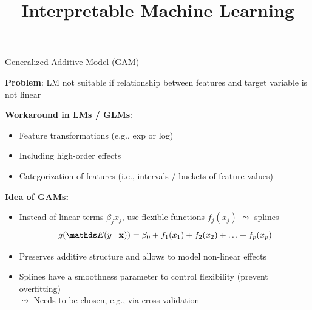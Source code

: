 \documentclass[11pt,compress,t,notes=noshow, aspectratio=169, xcolor=table]{beamer}
\title{Interpretable Machine Learning}
\date{}
\begin{document}
\newcommand{\titlefigure}{figure/gam_effects.pdf}
\newcommand{\learninggoals}{
\item Generalized additive model
\item Decision trees
\item Other interpretable models}



\begin{frame}{Generalized Additive Model (GAM) }

\textbf{Problem}: LM not suitable if relationship between features and target variable is not linear %

\medskip
\pause
\textbf{Workaround in LMs / GLMs}: 
 \begin{itemize}
        \item Feature transformations (e.g., exp or log)
        \item Including high-order effects
        \item Categorization of features (i.e., intervals / buckets of feature values)
        
    \end{itemize}
\medskip
\pause
\textbf{Idea of GAMs:}

    \begin{itemize}
        \item Instead of linear terms $\beta_j x_j$, use flexible functions $f_j(x_j)$ $\leadsto$ splines
            $$g(\E (y \mid \xv)) = \beta_0 + f_1(x_1) + f_2(x_2) + \ldots + f_p(x_p)$$
    
        \item Preserves additive structure and allows to model non-linear effects
        \item Splines have a smoothness parameter to control flexibility (prevent overfitting)\\
        $\leadsto$ Needs to be chosen, e.g., via cross-validation
    \end{itemize}
    
    

   

\end{frame}
\end{document}

